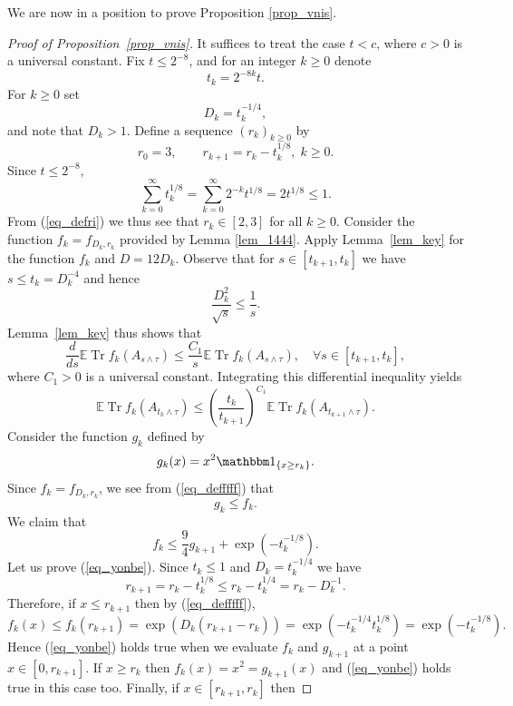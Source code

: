 \documentclass[12pt,a4paper]{article}
\newcommand{\Tr}{\mathop{\mathrm{Tr}}\nolimits}
\newcommand{\E}{\mathbb{E}}
\theoremstyle{definition}
\begin{document}
We are now in a position to prove Proposition \ref{prop_vnis}.
%
\begin{proof}[Proof of Proposition~\ref{prop_vnis}]
It suffices to treat the case $t < c$, where $c > 0$ is a universal constant. Fix $t\leq 2^{-8}$,
and for an integer $k \geq 0$ denote 
 $$ t_k = 2^{-8k} t. $$ 
 For $k \geq 0$ set
$$ D_k = t_k^{-1/4}, $$ and note 
 that $D_k >1$. 
Define a sequence $(r_k)_{k \geq 0}$ by
\begin{equation}\label{eq_defri}
r_0 = 3  , \qquad r_{k+1} = r_{k} - t_k^{1/8} , \; k \geq 0 .
\end{equation}
Since $t\leq 2^{-8}$,
\[
\sum_{k=0}^{\infty} t_k^{1/8} = \sum_{k=0}^{\infty} 2^{-k} t^{1/8} = 2 t^{1/8} \leq 1.
\]
From (\ref{eq_defri}) we thus see that $r_k \in [2,3]$ for all $k \geq 0$. 
Consider the function $f_k = f_{D_k,r_k}$ provided by Lemma \ref{lem_1444}.
Apply Lemma~\ref{lem_key} for the function $f_{k}$ and $D = 12 D_k$. 
Observe that for $s \in [t_{k+1},t_k]$ we have
$s \leq t_k = D_k^{-4}$ and hence 
\[
\frac{D_k^2}{\sqrt s} \leq \frac 1s .
\]
Lemma~\ref{lem_key} thus shows that
\[
\frac{d}{ds} \E  \Tr f_k ( A_{s\wedge \tau} )
\leq \frac {C_1} s \E \Tr f_k ( A_{s\wedge \tau} ) ,
\quad  \forall  s \in [t_{k+1},t_k] ,
\]
where $C_1 > 0$ is a universal constant.
Integrating this differential inequality yields
\begin{equation}\label{eq_step000}
\E \Tr f_{k} ( A_{t_{k}\wedge \tau} ) \leq  \left( \frac{t_k}{t_{k+1}} \right)^{C_1}
\E \Tr f_{k} (A_{t_{k+1} \wedge \tau} )  .
\end{equation}
Consider the function $g_k$ defined by
\[
g_k (x) = x^2 \mathbbm 1_{\{x \geq r_k \} }.
\]
Since $f_k = f_{D_k, r_k}$, we see from (\ref{eq_defffff}) that 
\begin{equation}\label{eq_tttoyoy}
g_k \leq f_k.
\end{equation}
We claim that 
\begin{equation}\label{eq_yonbe}
f_k \leq \frac 94  g_{k+1} + \exp(-t_{k}^{-1/8} ).
\end{equation}
Let us prove (\ref{eq_yonbe}). Since $t_k \leq 1$ and $D_k = t_k^{-1/4}$ we have
\[
r_{k+1} = r_{k} - t_k^{1/8} \leq r_k - t_k^{1/4} = r_k - D_k^{-1} .
\]
Therefore, if $x \leq r_{k+1}$ then by (\ref{eq_defffff}),
\[
f_{k} (x) \leq f_k (r_{k+1} ) = \exp (D_k (r_{k+1}-r_k))
= \exp(- t_k^{-1/4} t_k^{1/8} ) = \exp( -t_k^{-1/8} ).
\]
Hence (\ref{eq_yonbe}) holds true when we evaluate $f_k$ and $g_{k+1}$  at a point $x \in [0, r_{k+1}]$. 
If $x \geq r_{k}$ then $f_k(x) = x^2 = g_{k+1}(x)$
and (\ref{eq_yonbe}) holds true in this case too. Finally,  if $x \in [r_{k+1} , r_k]$ then

\end{proof}
\end{document}
